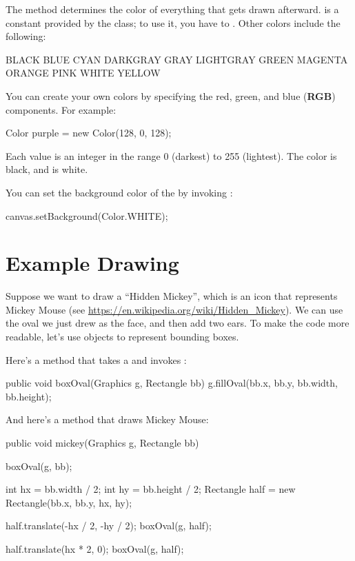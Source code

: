The  method determines the color of everything that gets drawn afterward.
 is a constant provided by the  class; to use it, you have to .
Other colors include the following:

\begin{stdout}
BLACK       BLUE      CYAN     DARKGRAY   GRAY    LIGHTGRAY
GREEN       MAGENTA   ORANGE   PINK       WHITE   YELLOW
\end{stdout}


You can create your own colors by specifying the red, green, and blue ({\bf RGB}) components.
For example:

\begin{code}
Color purple = new Color(128, 0, 128);
\end{code}

Each value is an integer in the range 0 (darkest) to 255 (lightest).
The color  is black, and  is white.

You can set the background color of the  by invoking :

\begin{code}
canvas.setBackground(Color.WHITE);
\end{code}


\section{Example Drawing}


Suppose we want to draw a ``Hidden Mickey'', which is an icon that represents Mickey Mouse (see \url{https://en.wikipedia.org/wiki/Hidden_Mickey}).
We can use the oval we just drew as the face, and then add two ears.
To make the code more readable, let's use  objects to represent bounding boxes.

Here's a method that takes a  and invokes :

\begin{code}
public void boxOval(Graphics g, Rectangle bb) {
    g.fillOval(bb.x, bb.y, bb.width, bb.height);
}
\end{code}

And here's a method that draws Mickey Mouse:

\begin{code}
public void mickey(Graphics g, Rectangle bb) {
    boxOval(g, bb);

    int hx = bb.width / 2;
    int hy = bb.height / 2;
    Rectangle half = new Rectangle(bb.x, bb.y, hx, hy);

    half.translate(-hx / 2, -hy / 2);
    boxOval(g, half);

    half.translate(hx * 2, 0);
    boxOval(g, half);
}
\end{code}

